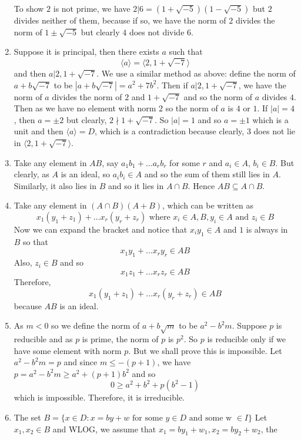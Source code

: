 \begin{enumerate}
    To show $2$ is not prime, we have $2|6=(1+\sqrt{-5})(1-\sqrt{-5})$ but $2$ divides neither of them, because if so, we have the norm of $2$ divides the norm of $1 \pm \sqrt{-5}$ but clearly $4$ does not divide $6$.\\
\item Suppose it is principal, then there exists $a$ such that
    $$\langle a \rangle=\langle 2,1+\sqrt{-7} \rangle$$ and then $a|2,1+\sqrt{-7}$.
    We use a similar method as above: define the norm of $a+b\sqrt{-7}$ to be
    $|a+b\sqrt{-7}|=a^2+7b^2$. Then if $a|2,1+\sqrt{-7}$, we have the norm of $a$ divides the norm of $2$ and $1+\sqrt{-7}$ and so the norm of $a$ divides $4$. Then as we have no element with norm $2$ so the norm of $a$ is $4$ or $1$. If $|a|=4$, then $a = \pm 2$ but clearly, $2 \nmid 1+\sqrt{-7}$. So $|a|=1$ and so $a=\pm 1$ which is a unit and then $\langle a \rangle=D$, which is a contradiction because clearly, $3$ does not lie in $\langle 2,1+\sqrt{-7} \rangle$.\\
\item Take any element in $AB$, say $a_1b_1+\ldots a_r b_r$ for some $r$ and $a_i \in A$, $b_i \in B$. But clearly, as $A$ is an ideal, so $a_i b_i \in A$ and so the sum of them still lies in $A$. Similarly, it also lies in $B$ and so it lies in $A \cap B$. Hence $AB \subseteq A \cap B$.\\
\item Take any element in $(A \cap B)(A+B)$, which can be written as
$$x_1 (y_1+z_1)+ \ldots x_r(y_r+z_r) \text{ where } x_i \in A,B, y_i \in A \text{ and } z_i \in B$$
    Now we can expand the bracket and notice that $x_i y_1\in A$ and $1$ is always in $B$
    so that $$x_1y_1+\ldots x_r y_r \in AB$$ Also, $z_i \in B$ and so
$$x_1 z_1+\ldots x_r z_r \in AB$$ Therefore,
$$x_1 (y_1+z_1)+ \ldots x_r(y_r+z_r) \in AB$$ because $AB$ is an ideal.\\
\item As $m <0$ so we define the norm of $a+b\sqrt{m}$ to be $a^2-b^2m$. Suppose $p$ is reducible and as $p$ is prime, the norm of $p$ is $p^2$. So $p$ is reducible only if we have some element with norm $p$. But we shall prove this is impossible. Let $a^2-b^2m=p$ and since $m \le -(p+1)$, we have $p=a^2-b^2m \ge a^2+(p+1)b^2$ and so
    $$0 \ge a^2+b^2+p(b^2-1)$$ which is impossible. Therefore, it is irreducible.\\
\item The set $B=\{x \in D: x=by+w \text{ for some } y \in D \text{ and some w } \in I\}$
    Let $x_1,x_2 \in B$ and WLOG, we assume that $x_1=by_1+w_1,x_2=by_2+w_2$, the

\end{enumerate}
